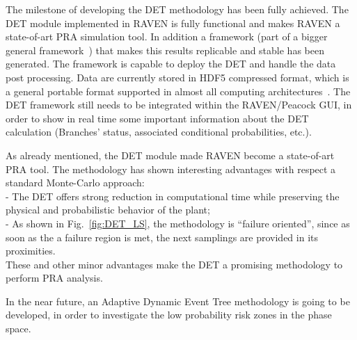 \label{sec:conclusions}
The milestone of developing the DET methodology has been fully achieved. The DET module implemented in RAVEN is fully functional and makes RAVEN a state-of-art PRA simulation tool. In addition a framework (part of a bigger general framework~\cite{RAVENFY13}) that makes this results replicable and stable has been generated. The framework is capable to deploy the DET and handle the data post processing. Data are currently stored in HDF5 compressed format, which is a general portable format supported in almost all computing architectures~\cite{HDF5}. 
The DET framework still needs to be integrated within the RAVEN/Peacock GUI, in order to show in real time some important information about the DET calculation (Branches' status, associated conditional probabilities, etc.).

As already mentioned, the DET module made RAVEN become a state-of-art PRA tool. The methodology has shown interesting advantages with respect a standard Monte-Carlo approach:    \\ - The DET offers strong reduction in computational time while preserving the physical and probabilistic behavior of the plant;
\\ - As shown in Fig.~\ref{fig:DET_LS}, the methodology is ``failure oriented'', since as soon as the a failure region is met, the next samplings are provided in its proximities.  
\\These and other minor advantages make the DET a promising methodology to perform PRA analysis.

In the near future, an Adaptive Dynamic Event Tree methodology is going to be developed, in order to investigate the low probability risk zones in the phase space.
  
